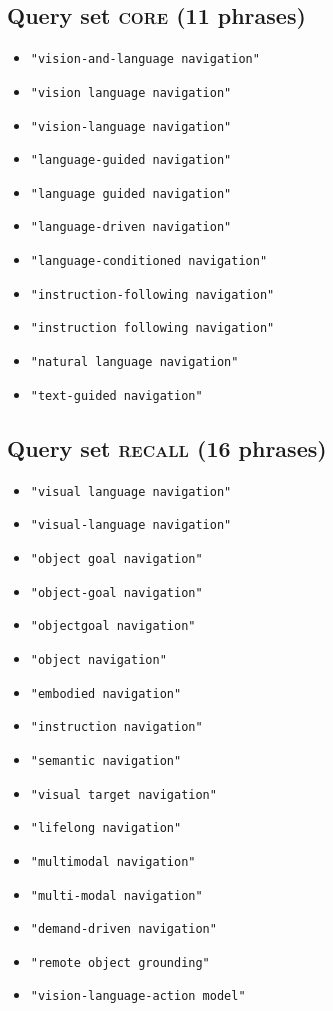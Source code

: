 
\subsection*{Query set \textsc{core} (11 phrases)}
\begin{itemize}\setlength\itemsep{0pt}
  \item \texttt{"vision-and-language navigation"}
  \item \texttt{"vision language navigation"}
  \item \texttt{"vision-language navigation"}
  \item \texttt{"language-guided navigation"}
  \item \texttt{"language guided navigation"}
  \item \texttt{"language-driven navigation"}
  \item \texttt{"language-conditioned navigation"}
  \item \texttt{"instruction-following navigation"}
  \item \texttt{"instruction following navigation"}
  \item \texttt{"natural language navigation"}
  \item \texttt{"text-guided navigation"}
\end{itemize}

\subsection*{Query set \textsc{recall} (16 phrases)}
\begin{itemize}\setlength\itemsep{0pt}
  \item \texttt{"visual language navigation"}
  \item \texttt{"visual-language navigation"}
  \item \texttt{"object goal navigation"}
  \item \texttt{"object-goal navigation"}
  \item \texttt{"objectgoal navigation"}
  \item \texttt{"object navigation"}
  \item \texttt{"embodied navigation"}
  \item \texttt{"instruction navigation"}
  \item \texttt{"semantic navigation"}
  \item \texttt{"visual target navigation"}
  \item \texttt{"lifelong navigation"}
  \item \texttt{"multimodal navigation"}
  \item \texttt{"multi-modal navigation"}
  \item \texttt{"demand-driven navigation"}
  \item \texttt{"remote object grounding"}
  \item \texttt{"vision-language-action model"}
\end{itemize}

